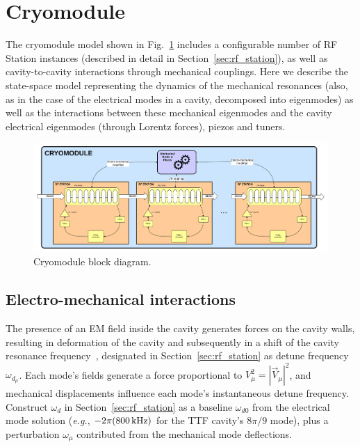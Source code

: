 \documentclass[a4paper,12pt]{article}
\begin{document}
\clearpage
\newpage

\section{Cryomodule}
\label{sec:cryomodule}

The cryomodule model shown in Fig.~\ref{fig:Cryomodule_block_diagram} includes a configurable number of RF Station instances (described in detail in Section~\ref{sec:rf_station}), as well as cavity-to-cavity interactions through mechanical couplings. Here we describe the state-space model representing the dynamics of the mechanical resonances (also, as in the case of the electrical modes in a cavity, decomposed into eigenmodes) as well as the interactions between these mechanical eigenmodes and the cavity electrical eigenmodes (through Lorentz forces), piezos and tuners.

\begin{figure}
\centering
\includegraphics[scale=0.3]{../figures/Cryomodule_block_diagram.png}
\caption{Cryomodule block diagram.}
\label{fig:Cryomodule_block_diagram}
\end{figure}

\subsection{Electro-mechanical interactions}

The presence of an EM field inside the cavity generates forces on the cavity walls, resulting in deformation of the cavity and subsequently in a shift of the cavity resonance frequency~\cite{ref:delayen}, designated in Section~\ref{sec:rf_station} as detune frequency $\omega_{d_\mu}$. Each mode's fields generate a force proportional to $V_\mu^2 = |\vec V_\mu|^2$, and mechanical displacements influence each mode's instantaneous detune frequency.  Construct $\omega_d$ in Section~\ref{sec:rf_station} as a baseline $\omega_{d0}$ from the electrical mode solution ({\it e.g.}, $-2\pi (800\thinspace {\rm kHz})$ for the TTF cavity's $8\pi/9$ mode), plus a perturbation $\omega_{\mu}$ contributed from the mechanical mode deflections.
\end{document}

